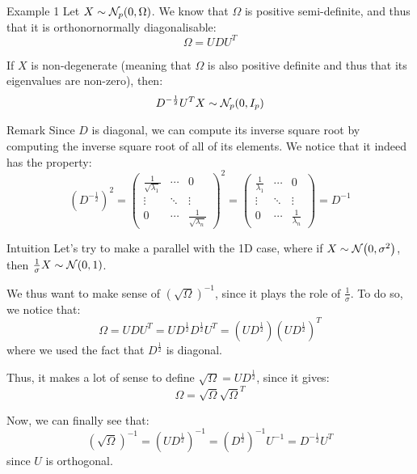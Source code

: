 \documentclass[a4paper]{article}
\begin{document}
\begin{parag}{Example 1}
    Let $X \followsdistr \mathcal{N}_p\left(0, \Omega\right)$. We know that $\Omega$ is positive semi-definite, and thus that it is orthonornormally diagonalisable: 
    \[\Omega = U D U^T\]
    
    If $X$ is non-degenerate (meaning that $\Omega$ is also positive definite and thus that its eigenvalues are non-zero), then: 
    \[D^{-\frac{1}{2}} U^T X \followsdistr \mathcal{N}_p\left(0, I_p\right)\]
    
    \begin{subparag}{Remark}
        Since $D$ is diagonal, we can compute its inverse square root by computing the inverse square root of all of its elements. We notice that it indeed has the property: 
        \[\left(D^{-\frac{1}{2}}\right)^2 = \begin{pmatrix} \frac{1}{\sqrt{\lambda_1}} & \cdots & 0 \\ \vdots & \ddots & \vdots \\ 0 & \cdots & \frac{1}{\sqrt{\lambda_n}} \end{pmatrix}^2 = \begin{pmatrix} \frac{1}{\lambda_1} & \cdots & 0 \\ \vdots & \ddots & \vdots \\ 0 & \cdots & \frac{1}{\lambda_n} \end{pmatrix} = D^{-1}\]
    \end{subparag}

    \begin{subparag}{Intuition}
        Let's try to make a parallel with the 1D case, where if $X \followsdistr \mathcal{N}\left(0, \sigma^2\right)$, then $\frac{1}{\sigma} X \followsdistr \mathcal{N}\left(0, 1\right)$. 

        We thus want to make sense of $\left(\sqrt{\Omega}\right)^{-1}$, since it plays the role of $\frac{1}{\sigma}$. To do so, we notice that: 
        \[\Omega = U D U^T = U D^{\frac{1}{2}} D^{\frac{1}{2}} U^T = \left(U D^{\frac{1}{2}}\right) \left(U D^{\frac{1}{2}}\right)^T\]
        where we used the fact that $D^{\frac{1}{2}}$ is diagonal.

        Thus, it makes a lot of sense to define $\sqrt{\Omega} = U D^{\frac{1}{2}}$, since it gives: 
        \[\Omega = \sqrt{\Omega} \sqrt{\Omega}^T\]
        
        Now, we can finally see that: 
        \[\left(\sqrt{\Omega}\right)^{-1} = \left(U D^{\frac{1}{2}}\right)^{-1} = \left(D^{\frac{1}{2}}\right)^{-1} U^{-1} = D^{-\frac{1}{2}} U^T\]
        since $U$ is orthogonal.


\end{subparag}
\end{parag}
\end{document}
